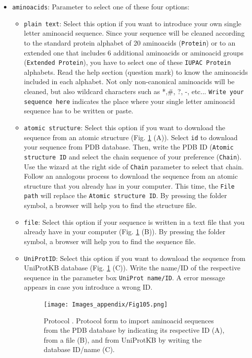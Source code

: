 \documentclass[12pt, draft]{article} %
\newcommand{\ffigure}[1]{{Fig. {\ref{#1}}}\xspace}
\newcommand{\scommand}[1]{{{\keys{#1}}}\xspace}
\newcommand{\ttt}[1]{\texttt{#1}}
\begin{document}
\begin{appendices}
\begin{itemize}
\begin{itemize}
  \begin{itemize}
  \item \ttt{aminoacids}: Parameter to select one of these four options:\\
   \begin{itemize}
   \item \ttt{plain text}: Select this option if you want to introduce your own single letter aminoacid sequence. Since your sequence will be cleaned according to the standard protein alphabet of 20 aminoacids (\ttt{Protein}) or to an extended one that includes 6 additional aminoacids or aminoacid groups (\ttt{Extended Protein}), you have to select one of these \ttt{IUPAC Protein} alphabets. Read the help section (question mark) to know the aminoacids included in each alphabet. Not only non-canonical aminoacids will be cleaned, but also wildcard characters such as *,\#, ?, -, etc... \ttt{Write your sequence here} indicates the place where your single letter aminoacid sequence has to be written or paste.\\ 
   \item \ttt{atomic structure}: Select this option if you want to download the sequence from an atomic structure (\ffigure{fig:app_protocol_sequence_2} (A)). Select \ttt{id} to download your sequence from PDB database. Then, write the PDB ID (\ttt{Atomic structure ID} and select the chain sequence of your preference (\ttt{Chain}). Use the wizard at the right side of \ttt{Chain} parameter to select that chain. Follow an analogous process to download the sequence from an atomic structure that you already has in your computer. This time, the \ttt{File path} will replace the \ttt{Atomic structure ID}. By pressing the folder symbol, a browser will help you to find the structure file.\\
   \item \ttt{file}: Select this option if your sequence is written in a text file that you already have in your computer (\ffigure{fig:app_protocol_sequence_2} (B)). By pressing the folder symbol, a browser will help you to find the sequence file.\\
   \item \ttt{UniProtID}: Select this option if you want to download the sequence from UniProtKB database (\ffigure{fig:app_protocol_sequence_2} (C)). Write the name/ID of the respective sequence in the parameter box \ttt{UniProt name/ID}. A error message appears in case you introduce a wrong ID.\\
   
   \begin{figure}[H]
    \centering 
    \captionsetup{width=.7\linewidth} 
    \texttt{[image: Images\_appendix/Fig105.png]}
    \caption{Protocol \scommand{import sequence}. Protocol form to import aminoacid sequences from the PDB database by indicating its respective ID (A), from a file (B), and from UniProtKB by writing the database ID/name (C).}
    \label{fig:app_protocol_sequence_2}
   \end{figure}
   

\end{itemize}
\end{itemize}
\end{itemize}
\end{itemize}
\end{appendices}
\end{document}
